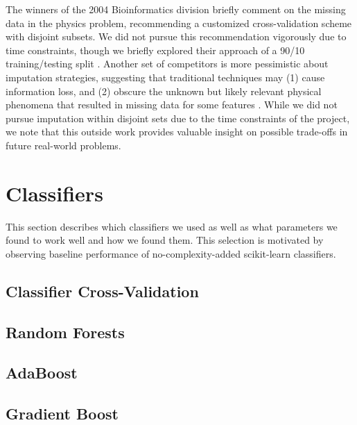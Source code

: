 \documentclass{article}
\begin{document}
The winners of the 2004 Bioinformatics division briefly comment on the missing data in the physics problem, recommending a customized cross-validation scheme with disjoint subsets. 
We did not pursue this recommendation vigorously due to time constraints, though we briefly explored their approach of a 90/10 training/testing split \cite{pfahringer2004weka}.
Another set of competitors is more pessimistic about imputation strategies, suggesting that traditional techniques may (1) cause information loss, and (2) obscure the unknown but likely relevant physical phenomena that resulted in missing data for some features \cite{vogel2004anti}.
While we did not pursue imputation within disjoint sets due to the time constraints of the project, we note that this outside work provides valuable insight on possible trade-offs in future real-world problems.


\section{Classifiers}

This section describes which classifiers we used as well as what parameters we found to work well and how we found them. 
This selection is motivated by observing baseline performance of no-complexity-added scikit-learn classifiers.


\subsection{Classifier Cross-Validation}

 
\subsection{Random Forests}

\subsection{AdaBoost}

\subsection{Gradient Boost}
\end{document}

